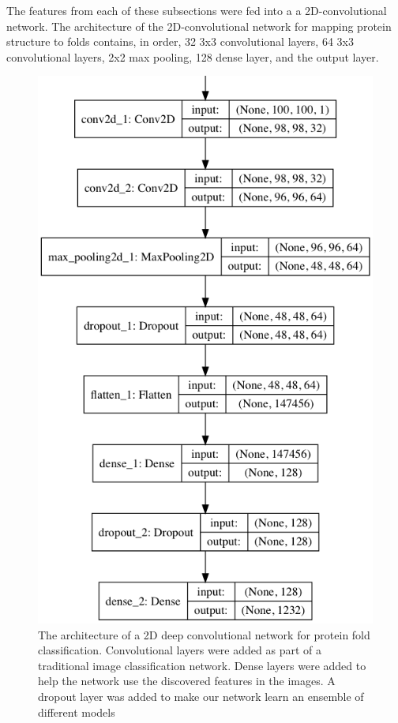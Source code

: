 \documentclass[12pt, a4paper, twocolumn, fullpage]{article}
\theoremstyle{plain}
\theoremstyle{definition}
\theoremstyle{remark}
\begin{document}
The features from each of these subsections were fed into a a 2D-convolutional network. The architecture of the 2D-convolutional network for mapping protein structure to folds contains, in order, 32 3x3 convolutional layers, 64 3x3 convolutional layers, 2x2 max pooling, 128 dense layer, and the output layer.

\begin{figure}
\includegraphics[width=\linewidth]{model_plot.png}
\caption{The architecture of a 2D deep convolutional network for protein fold classification. Convolutional layers were added as part of a traditional image classification network. Dense layers were added to help the network use the discovered features in the images. A dropout layer was added to make our network learn an ensemble of different models}
\label{model_plot}
\end{figure}
\end{document}
